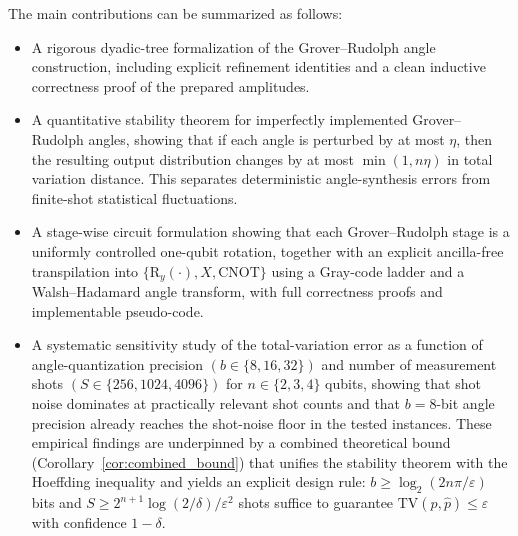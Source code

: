 \documentclass{article}
\newcommand{\RY}{\mathrm{R}_y}
\newcommand{\CNOT}{\mathrm{CNOT}}
\numberwithin{equation}{section}
\begin{document}
The main contributions can be summarized as follows:
\begin{itemize}
\item A rigorous dyadic-tree formalization of the Grover--Rudolph angle construction, including explicit
      refinement identities and a clean inductive correctness proof of the prepared amplitudes.
\item A quantitative stability theorem for imperfectly implemented Grover--Rudolph angles, showing that
      if each angle is perturbed by at most \(\eta\), then the resulting output distribution changes by
      at most \(\min(1,n\eta)\) in total variation distance. This separates deterministic angle-synthesis
      errors from finite-shot statistical fluctuations.
\item A stage-wise circuit formulation showing that each Grover--Rudolph stage is a uniformly controlled
      one-qubit rotation, together with an explicit ancilla-free transpilation into
      \(\{\RY(\cdot),X,\CNOT\}\) using a Gray-code ladder and a Walsh--Hadamard angle transform, with
      full correctness proofs and implementable pseudo-code.
\item A systematic sensitivity study of the total-variation error as a function of angle-quantization
      precision \((b\in\{8,16,32\})\) and number of measurement shots \((S\in\{256,1024,4096\})\)
      for \(n\in\{2,3,4\}\) qubits, showing that shot noise dominates at practically relevant
      shot counts and that \(b=8\)-bit angle precision already reaches the shot-noise floor in the
      tested instances.
      These empirical findings are underpinned by a combined theoretical bound (Corollary~\ref{cor:combined_bound})
      that unifies the stability theorem with the Hoeffding inequality and yields an explicit
      design rule: $b\ge\log_2(2n\pi/\varepsilon)$ bits and $S\ge 2^{n+1}\log(2/\delta)/\varepsilon^2$
      shots suffice to guarantee $\mathrm{TV}(p,\hat p)\le\varepsilon$ with confidence $1-\delta$.
\end{itemize}
\end{document}
